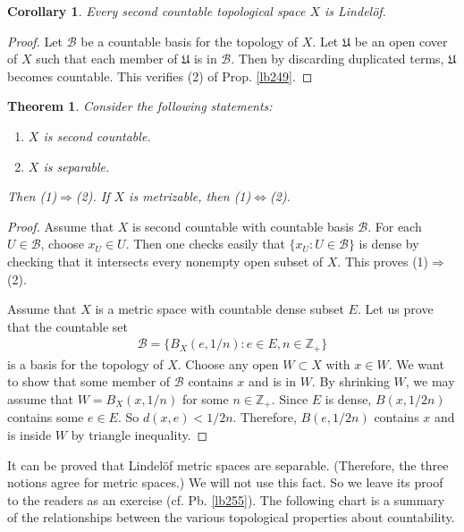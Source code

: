 \documentclass[12pt,b5paper,notitlepage]{article}
\theoremstyle{definition}
\theoremstyle{plain}
\newtheorem{thm}[df]{Theorem}
\newtheorem{co}[df]{Corollary}
\newcommand{\fk}{\mathfrak}
\newcommand{\mc}{\mathcal}
\newcommand{\Zbb}{\mathbb Z}
\numberwithin{equation}{section}
\begin{document}
\begin{co}\label{lb265}
Every second countable topological space $X$ is Lindel\"of.
\end{co}

\begin{proof}
Let $\mc B$ be a countable basis for the topology of $X$. Let $\fk U$ be an open cover of $X$ such that each member of $\fk U$ is in $\mc B$. Then by discarding duplicated terms, $\fk U$ becomes countable. This verifies (2) of Prop. \ref{lb249}.
\end{proof}


\begin{thm}\label{lb250}
Consider the following statements:
\begin{enumerate}[label=(\arabic*)]
\item $X$ is second countable.
\item $X$ is separable.
\end{enumerate}
Then (1)$\Rightarrow$(2). If $X$ is metrizable, then (1)$\Leftrightarrow$(2).
\end{thm}



\begin{proof}
Assume that $X$ is second countable with countable basis $\mc B$. For each $U\in\mc B$, choose $x_U\in U$. Then one checks easily that $\{x_U:U\in\mc B\}$ is dense by checking that it intersects every nonempty open subset of $X$. This proves (1)$\Rightarrow$(2).

Assume that $X$ is a metric space with countable dense subset $E$. Let us prove that the countable set
\begin{align*}
\mc B=\{B_X(e,1/n):e\in E,n\in\Zbb_+\}
\end{align*}
is a basis for the topology of $X$. Choose any open $W\subset X$ with $x\in W$. We want to show that some member of $\mc B$ contains $x$ and is in $W$. By shrinking $W$, we may assume that $W=B_X(x,1/n)$ for some $n\in\Zbb_+$. Since $E$ is dense, $B(x,1/2n)$ contains some $e\in E$. So $d(x,e)<1/2n$. Therefore,  $B(e,1/2n)$ contains $x$  and is inside $W$ by triangle inequality.
\end{proof}


It can be proved that Lindel\"of metric spaces are separable. (Therefore, the three notions agree for metric spaces.) We will not use this fact. So we leave its proof to the readers as an exercise (cf. Pb. \ref{lb255}). The following chart is a summary of the relationships between the various topological properties about countability.
\end{document}
